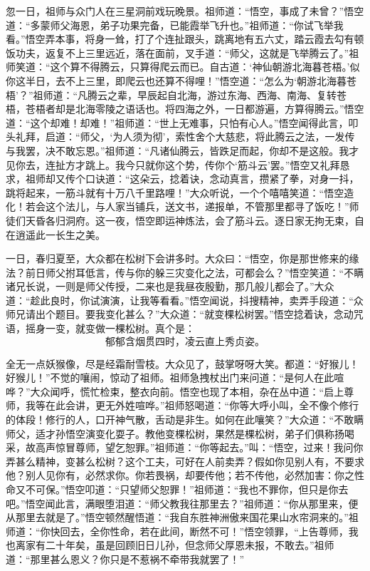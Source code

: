 \documentclass[12pt]{lsbook}
\begin{document}
忽一日，祖师与众门人在三星洞前戏玩晚景。祖师道：“悟空，事成了未曾？”悟空道：“多蒙师父海恩，弟子功果完备，已能霞举飞升也。”祖师道：“你试飞举我看。”悟空弄本事，将身一耸，打了个连扯跟头，跳离地有五六丈，踏云霞去勾有顿饭功夫，返复不上三里远近，落在面前，叉手道：“师父，这就是飞举腾云了。”祖师笑道：“这个算不得腾云，只算得爬云而已。自古道：‘神仙朝游北海暮苍梧。’似你这半日，去不上三里，即爬云也还算不得哩！”悟空道：“怎么为‘朝游北海暮苍梧’？”祖师道：“凡腾云之辈，早辰起自北海，游过东海、西海、南海、复转苍梧，苍梧者却是北海零陵之语话也。将四海之外，一日都游遍，方算得腾云。”悟空道：“这个却难！却难！”祖师道：“世上无难事，只怕有心人。”悟空闻得此言，叩头礼拜，启道：“师父，‘为人须为彻’，索性舍个大慈悲，将此腾云之法，一发传与我罢，决不敢忘恩。”祖师道：“凡诸仙腾云，皆跌足而起，你却不是这般。我才见你去，连扯方才跳上。我今只就你这个势，传你个‘筋斗云’罢。”悟空又礼拜恳求，祖师却又传个口诀道：“这朵云，捻着诀，念动真言，攒紧了拳，对身一抖，跳将起来，一筋斗就有十万八千里路哩！”大众听说，一个个嘻嘻笑道：“悟空造化！若会这个法儿，与人家当铺兵，送文书，递报单，不管那里都寻了饭吃！”师徒们天昏各归洞府。这一夜，悟空即运神炼法，会了筋斗云。逐日家无拘无束，自在逍遥此一长生之美。

一日，春归夏至，大众都在松树下会讲多时。大众曰：“悟空，你是那世修来的缘法？前日师父拊耳低言，传与你的躲三灾变化之法，可都会么？”悟空笑道：“不瞒诸兄长说，一则是师父传授，二来也是我昼夜殷勤，那几般儿都会了。”大众道：“趁此良时，你试演演，让我等看看。”悟空闻说，抖搜精神，卖弄手段道：“众师兄请出个题目。要我变化甚么？”大众道：“就变棵松树罢。”悟空捻着诀，念动咒语，摇身一变，就变做一棵松树。真个是：
\[
郁郁含烟贯四时，凌云直上秀贞姿。
\]

全无一点妖猴像，尽是经霜耐雪枝。大众见了，鼓掌呀呀大笑。都道：“好猴儿！好猴儿！”不觉的嚷闹，惊动了祖师。祖师急拽杖出门来问道：“是何人在此喧哗？”大众闻呼，慌忙检束，整衣向前。悟空也现了本相，杂在丛中道：“启上尊师，我等在此会讲，更无外姓喧哗。”祖师怒喝道：“你等大呼小叫，全不像个修行的体段！修行的人，口开神气散，舌动是非生。如何在此嚷笑？”大众道：“不敢瞒师父，适才孙悟空演变化耍子。教他变棵松树，果然是棵松树，弟子们俱称扬喝采，故高声惊冒尊师，望乞恕罪。”祖师道：“你等起去。”叫：“悟空，过来！我问你弄甚么精神，变甚么松树？这个工夫，可好在人前卖弄？假如你见别人有，不要求他？别人见你有，必然求你。你若畏祸，却要传他；若不传他，必然加害：你之性命又不可保。”悟空叩道：“只望师父恕罪！”祖师道：“我也不罪你，但只是你去吧。”悟空闻此言，满眼堕泪道：“师父教我往那里去？”祖师道：“你从那里来，便从那里去就是了。”悟空顿然醒悟道：“我自东胜神洲傲来国花果山水帘洞来的。”祖师道：“你快回去，全你性命，若在此间，断然不可！”悟空领罪，“上告尊师，我也离家有二十年矣，虽是回顾旧日儿孙，但念师父厚恩未报，不敢去。”祖师道：“那里甚么恩义？你只是不惹祸不牵带我就罢了！”
\end{document}
